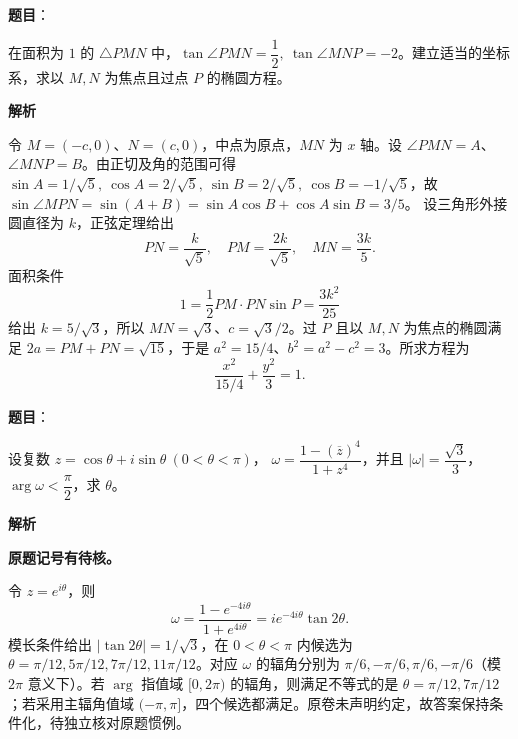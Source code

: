 \begin{answer}

\textbf{题目}：

在面积为 $1$ 的 $\triangle PMN$ 中，$\tan\angle PMN=\dfrac12,\ \tan\angle MNP=-2$。建立适当的坐标系，求以 $M,N$ 为焦点且过点 $P$ 的椭圆方程。

\textbf{解析}

令 $M=(-c,0)$、$N=(c,0)$，中点为原点，$MN$ 为 $x$ 轴。设 $\angle PMN=A$、$\angle MNP=B$。由正切及角的范围可得
$\sin A=1/\sqrt5,\ \cos A=2/\sqrt5,\ \sin B=2/\sqrt5,\ \cos B=-1/\sqrt5$，故
$\sin\angle MPN=\sin(A+B)=\sin A\cos B+\cos A\sin B=3/5$。
设三角形外接圆直径为 $k$，正弦定理给出
\nopagebreak[4]
\[
PN=\frac{k}{\sqrt5},\quad PM=\frac{2k}{\sqrt5},\quad MN=\frac{3k}{5}.
\]
面积条件
\nopagebreak[4]
\[
1=\frac12 PM\cdot PN\sin P=\frac{3k^2}{25}
\]
给出 $k=5/\sqrt3$，所以 $MN=\sqrt3$、$c=\sqrt3/2$。过 $P$ 且以 $M,N$ 为焦点的椭圆满足 $2a=PM+PN=\sqrt{15}$，于是 $a^2=15/4$、$b^2=a^2-c^2=3$。所求方程为
\nopagebreak[4]
\[
\frac{x^2}{15/4}+\frac{y^2}{3}=1.
\]


\end{answer}
\begin{answer}

\textbf{题目}：

 设复数 $z=\cos\theta+i\sin\theta\ (0<\theta<\pi)$，
$\omega=\dfrac{1-(\overline z)^4}{1+z^4}$，并且 $|\omega|=\dfrac{\sqrt3}{3}$，$\arg\omega<\dfrac\pi2$，求 $\theta$。

\textbf{解析}

\textbf{原题记号有待核。}

令 $z=e^{i\theta}$，则
\nopagebreak[4]
\[
\omega=\frac{1-e^{-4i\theta}}{1+e^{4i\theta}}
=i e^{-4i\theta}\tan2\theta.
\]
模长条件给出 $|\tan2\theta|=1/\sqrt3$，在 $0<\theta<\pi$ 内候选为
$\theta=\pi/12,5\pi/12,7\pi/12,11\pi/12$。对应 $\omega$ 的辐角分别为 $\pi/6,-\pi/6,\pi/6,-\pi/6$（模 $2\pi$ 意义下）。若 $\arg$ 指值域 $[0,2\pi)$ 的辐角，则满足不等式的是 $\theta=\pi/12,7\pi/12$；若采用主辐角值域 $(-\pi,\pi]$，四个候选都满足。原卷未声明约定，故答案保持条件化，待独立核对原题惯例。

\gkanswer{答案：原题无唯一解集：主值 \((-\pi,\pi]\) 下四个候选均满足，\([0,2\pi)\) 下仅 \(\theta=\dfrac{\pi}{12},\dfrac{7\pi}{12}\)}

\end{answer}